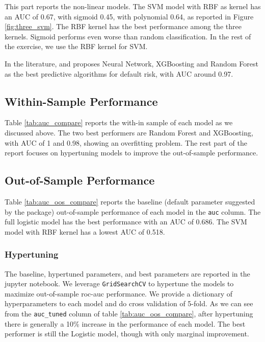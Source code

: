 \documentclass[10pt]{article} %
\begin{document}
    This part reports the non-linear models.
    The SVM model with RBF as kernel has an AUC of 0.67, with sigmoid 0.45, with polynomial 0.64, as reported in Figure \ref{fig:three_svm}. The RBF kernel has the best performance among the three kernels. Sigmoid performs even worse than random classification. In the rest of the exercise, we use the RBF kernel for SVM.

    In the literature, \cite{Bazzanaetal2023} and \cite{Wu2022} proposes Neural Network, XGBoosting and Random Forest as the best predictive algorithms for default risk, with AUC around 0.97.

    \subsection{Within-Sample Performance}
    
    Table \ref{tab:auc_compare} reports the with-in sample of each model as we discussed above. The two best performers are Random Forest and XGBoosting, with AUC of 1 and 0.98, showing an overfitting problem. The rest part of the report focuses on hypertuning models to improve the out-of-sample performance. 

    \subsection{Out-of-Sample Performance}
    
    Table \ref{tab:auc_oos_compare} reports the baseline (default parameter suggested by the package) out-of-sample performance of each model in the \texttt{auc} column. The full logistic model has the best performance with an AUC of 0.686. The SVM model with RBF kernel has a lowest AUC of 0.518. 

    \subsubsection{Hypertuning}
    The baseline, hypertuned parameters, and best parameters are reported in the jupyter notebook. We leverage \texttt{GridSearchCV} to hypertune the models to maximize out-of-sample roc-auc performance. We provide a dictionary of hyperparameters to each model and do cross validation of 5-fold. As we can see from the \texttt{auc\_tuned} column of table \ref{tab:auc_oos_compare}, after hypertuning there is generally a 10\% increase in the performance of each model. The best performer is still the Logistic model, though with only marginal improvement.
    


\newpage
\footnotesize


\end{document}
